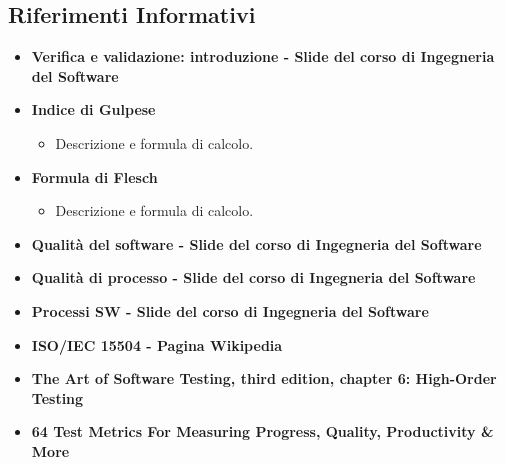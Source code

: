 \documentclass[PianoDiQualifica.tex]{subfiles}
\begin{document}
		\subsection{Riferimenti Informativi}
		\begin{itemize}
			\item \textbf{Verifica e validazione: introduzione - Slide del corso di Ingegneria del Software}\\
			\item \textbf{Indice di Gulpese}\\
			\begin{itemize}
				\item Descrizione e formula di calcolo.
			\end{itemize}
			\item \textbf{Formula di Flesch}\\
			\begin{itemize}
				\item Descrizione e formula di calcolo.
			\end{itemize}
			\item \textbf{Qualità del software - Slide del corso di Ingegneria del Software}\\
			\item \textbf{Qualità di processo - Slide del corso di Ingegneria del Software}\\
			\item \textbf{Processi SW - Slide del corso di Ingegneria del Software}\\
			\item \textbf{ISO/IEC 15504 - Pagina Wikipedia}\\
			\item \textbf{The Art of Software Testing, third edition, chapter 6: High-Order Testing} \\
			\item \textbf{64 Test Metrics For Measuring Progress, Quality, Productivity \& More}\\
		\end{itemize}
	
\end{document}

